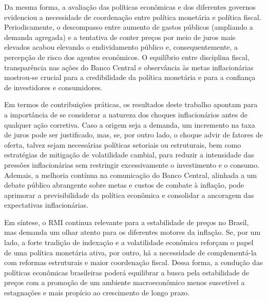 \documentclass[12pt,oneside,a4paper,chapter=TITLE,english,brazil,sumario=abnt-6027-2012]{abntex2}
\begin{document}
Da mesma forma, a avaliação das políticas econômicas e dos diferentes governos evidenciou a necessidade de coordenação entre política monetária e política fiscal. Periodicamente, o descompasso entre aumento de gastos públicos (ampliando a demanda agregada) e a tentativa de conter preços por meio de juros mais elevados acabou elevando o endividamento público e, consequentemente, a percepção de risco dos agentes econômicos. O equilíbrio entre disciplina fiscal, transparência nas ações do Banco Central e observância às metas inflacionárias mostrou-se crucial para a credibilidade da política monetária e para a confiança de investidores e consumidores.

Em termos de contribuições práticas, os resultados deste trabalho apontam para a importância de se considerar a natureza dos choques inflacionários antes de qualquer ação corretiva. Caso a origem seja a demanda, um incremento na taxa de juros pode ser justificado, mas, se, por outro lado, o choque advir de fatores de oferta, talvez sejam necessárias políticas setoriais ou estruturais, bem como estratégias de mitigação de volatilidade cambial, para reduzir a intensidade das pressões inflacionárias sem restringir excessivamente o investimento e o consumo. Ademais, a melhoria contínua na comunicação do Banco Central, alinhada a um debate público abrangente sobre metas e custos de combate à inflação, pode aprimorar a previsibilidade da política econômica e consolidar a ancoragem das expectativas inflacionárias.

Em síntese, o RMI continua relevante para a estabilidade de preços no Brasil, mas demanda um olhar atento para os diferentes motores da inflação. Se, por um lado, a forte tradição de indexação e a volatilidade econômica reforçam o papel de uma política monetária ativa, por outro, há a necessidade de complementá-la com reformas estruturais e maior coordenação fiscal. Dessa forma, a condução das políticas econômicas brasileiras poderá equilibrar a busca pela estabilidade de preços com a promoção de um ambiente macroeconômico menos suscetível a estagnações e mais propício ao crescimento de longo prazo.





\end{document}
